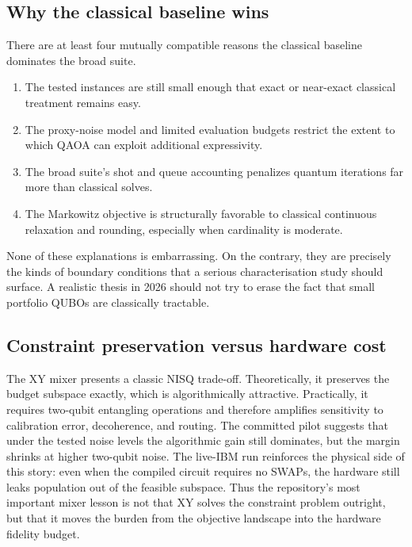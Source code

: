 \documentclass[11pt]{article}
\begin{document}
\subsection{Why the classical baseline wins}

There are at least four mutually compatible reasons the classical baseline dominates the broad suite.
\begin{enumerate}[leftmargin=1.5em]
\item The tested instances are still small enough that exact or near-exact classical treatment remains easy.
\item The proxy-noise model and limited evaluation budgets restrict the extent to which QAOA can exploit additional expressivity.
\item The broad suite's shot and queue accounting penalizes quantum iterations far more than classical solves.
\item The Markowitz objective is structurally favorable to classical continuous relaxation and rounding, especially when cardinality is moderate.
\end{enumerate}

None of these explanations is embarrassing. On the contrary, they are precisely the kinds of boundary conditions that a serious characterisation study should surface. A realistic thesis in 2026 should not try to erase the fact that small portfolio QUBOs are classically tractable.

\subsection{Constraint preservation versus hardware cost}

The \(\mathrm{XY}\) mixer presents a classic NISQ trade-off. Theoretically, it preserves the budget subspace exactly, which is algorithmically attractive. Practically, it requires two-qubit entangling operations and therefore amplifies sensitivity to calibration error, decoherence, and routing. The committed pilot suggests that under the tested noise levels the algorithmic gain still dominates, but the margin shrinks at higher two-qubit noise. The live-IBM run reinforces the physical side of this story: even when the compiled circuit requires no SWAPs, the hardware still leaks population out of the feasible subspace. Thus the repository's most important mixer lesson is not that \(\mathrm{XY}\) solves the constraint problem outright, but that it moves the burden from the objective landscape into the hardware fidelity budget.
\end{document}
